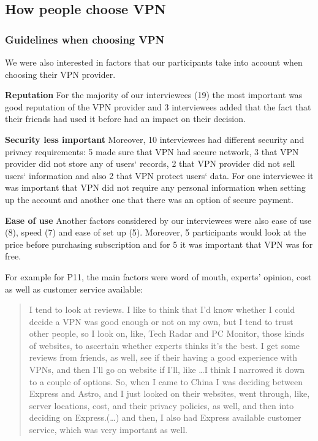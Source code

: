\subsection{How people choose VPN} 
\label{sec:findings-choosing}
\subsubsection{Guidelines when choosing VPN}
We were also interested in factors that our participants take into account when choosing their VPN provider. 

\textbf{Reputation} For the majority of our interviewees (19) the most important was good reputation of the VPN provider and 3 interviewees added that the fact that their friends had used it before had an impact on their decision. 

\textbf{Security less important} Moreover, 10 interviewees had different security and privacy requirements: 5 made sure that VPN had secure network, 3 that VPN provider did not store any of users‘ records, 2 that VPN provider did not sell users‘ information and also 2 that VPN protect users‘ data. For one interviewee it was important that VPN did not require any personal information when setting up the account and another one that there was an option of secure payment. 

\textbf{Ease of use} Another factors considered by our interviewees were also ease of use (8), speed (7) and ease of set up (5). Moreover, 5 participants would look at the price before purchasing subscription and for 5 it was important that VPN was for free.   

For example for P11, the main factors were word of mouth, experts’ opinion, cost as well as customer service available:
\begin{quote}I tend to look at reviews. I like to think that I'd know whether I could decide a VPN was good enough or not on my own, but I tend to trust other people, so I look on, like, Tech Radar and PC Monitor, those kinds of websites, to ascertain whether experts thinks it's the best. I get some reviews from friends, as well, see if their having a good experience with VPNs, and then I'll go on website if I'll, like \dots I think I narrowed it down to a couple of options. So, when I came to China I was deciding between Express and Astro, and I just looked on their websites, went through, like, server locations, cost, and their privacy policies, as well, and then into deciding on Express.(\dots)
and then, I also had Express available customer service, which was very important as well.\end{quote}

